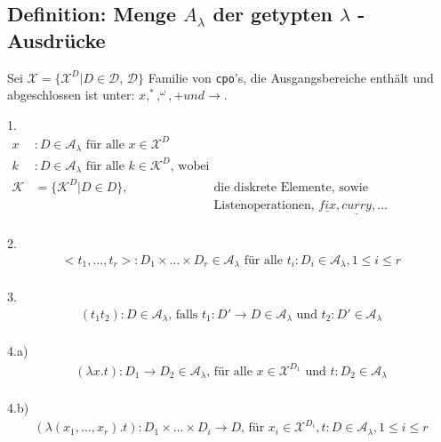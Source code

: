 \subsection{Definition: Menge $A_{\lambda}$ der getypten $\lambda$ -Ausdrücke}
Sei $\mathcal{X} = \{ \mathcal{X}^D | D \in \mathcal{D}$, $\mathcal{D} \}$ Familie von \lstinline!cpo!'s, die Ausgangsbereiche enthält und abgeschlossen ist unter: $x, ^* , ^\omega , + und \rightarrow$.
\begin{compactitem}
\item[1.] \begin{align*}
x &: D \in \mathcal{A}_\lambda \text{ für alle } x \in \mathcal{X}^D \tag{Atome, Variable}\\
k &: D \in \mathcal{A}_\lambda \text{ für alle } k \in \mathcal{K}^D \text{, wobei } \\ 
\mathcal{K} &= \{ \mathcal{K}^D | D \in D \}, &\text{die diskrete Elemente, sowie Projektionsfunktion,} \\
&& \text{Listenoperationen, } \underline{fix}, \underline{curry}, \dots \\
\end{align*}
\item[2.] \begin{align*}
<t_1, \dots , t_r> : D_1 \times \dots \times D_r \in \mathcal{A}_\lambda \text{ für alle } t_i : D_i \in \mathcal{A}_\lambda, 1 \leq i \leq r \tag{Tupel}\\
\end{align*}
\item[3.] \begin{align*}
(t_1 t_2) : D \in \mathcal{A}_\lambda \text{, falls } t_1 : D' \rightarrow D \in \mathcal{A}_\lambda \text{ und } t_2 : D' \in \mathcal{A}_\lambda \tag{Applilation} \\
\end{align*}
\item[4.a)] \begin{align*}
(\lambda x.t) : D_1 \rightarrow D_2 \in \mathcal{A}_\lambda \text{, für alle } x \in \mathcal{X}^{D_1} \text{ und } t:D_2 \in \mathcal{A}_\lambda  \tag{monadisch}\\
\end{align*}
\item[4.b)] \begin{align*}
(\lambda (x_1, \dots , x_r).t) : D_1 \times \dots \times D_i \rightarrow D \text{, für } x_i \in \mathcal{X}^{D_i}, t:D \in \mathcal{A}_\lambda, 1 \leq  i \leq r\tag{polyadisch}\\
\end{align*}
\end{compactitem}
